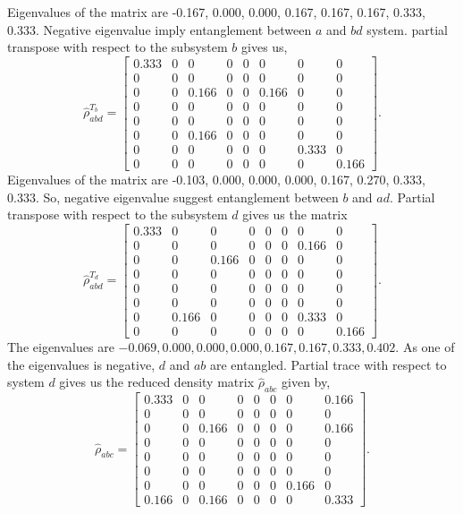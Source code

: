\documentclass{amsart}
\theoremstyle{plain}
\theoremstyle{definition}
\theoremstyle{plain}
\begin{document}
Eigenvalues of the matrix are -0.167, 0.000, 0.000, 0.167, 0.167, 0.167, 0.333, 0.333. Negative eigenvalue imply entanglement between $a$ and $bd$ system. partial transpose with respect to the subsystem $b$ gives us,
\begin{equation*}
	\hat{\rho}_{abd}^{T_b} = \left[\begin{matrix}0.333 & 0 & 0 & 0 & 0 & 0 & 0 & 0\\0 & 0 & 0 & 0 & 0 & 0 & 0 & 0\\0 & 0 & 0.166 & 0 & 0 & 0.166 & 0 & 0\\0 & 0 & 0 & 0 & 0 & 0 & 0 & 0\\0 & 0 & 0 & 0 & 0 & 0 & 0 & 0\\0 & 0 & 0.166 & 0 & 0 & 0 & 0 & 0\\0 & 0 & 0 & 0 & 0 & 0 & 0.333 & 0\\0 & 0 & 0 & 0 & 0 & 0 & 0 & 0.166\end{matrix}\right].
\end{equation*}
Eigenvalues of the matrix are -0.103, 0.000, 0.000, 0.000, 0.167, 0.270, 0.333, 0.333. So, negative eigenvalue suggest entanglement between $b$ and $ad$.
Partial transpose with respect to the subsystem $d$ gives us the matrix
\begin{equation*}
	\hat{\rho}_{abd}^{T_d} = \left[\begin{matrix}0.333 & 0 & 0 & 0 & 0 & 0 & 0 & 0\\0 & 0 & 0 & 0 & 0 & 0 & 0.166 & 0\\0 & 0 & 0.166 & 0 & 0 & 0 & 0 & 0\\0 & 0 & 0 & 0 & 0 & 0 & 0 & 0\\0 & 0 & 0 & 0 & 0 & 0 & 0 & 0\\0 & 0 & 0 & 0 & 0 & 0 & 0 & 0\\0 & 0.166 & 0 & 0 & 0 & 0 & 0.333 & 0\\0 & 0 & 0 & 0 & 0 & 0 & 0 & 0.166\end{matrix}\right].
\end{equation*}
The eigenvalues are $-0.069, 0.000, 0.000, 0.000, 0.167, 0.167, 0.333, 0.402$. As one of the eigenvalues is negative, $d$ and $ab$ are entangled.
Partial trace with respect to system $d$ gives us the reduced density matrix $\hat{\rho}_{abc}$ given by,
\begin{equation*}
	\hat{\rho}_{abc} =\left[\begin{matrix}0.333 & 0 & 0 & 0 & 0 & 0 & 0 & 0.166\\0 & 0 & 0 & 0 & 0 & 0 & 0 & 0\\0 & 0 & 0.166 & 0 & 0 & 0 & 0 & 0.166\\0 & 0 & 0 & 0 & 0 & 0 & 0 & 0\\0 & 0 & 0 & 0 & 0 & 0 & 0 & 0\\0 & 0 & 0 & 0 & 0 & 0 & 0 & 0\\0 & 0 & 0 & 0 & 0 & 0 & 0.166 & 0\\0.166 & 0 & 0.166 & 0 & 0 & 0 & 0 & 0.333\end{matrix}\right]
	.
\end{equation*}
\end{document}
